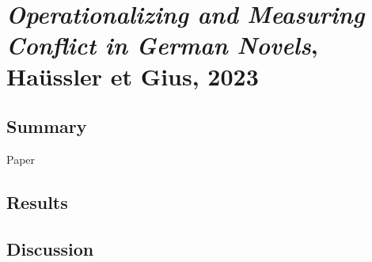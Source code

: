 \documentclass[aspectratio=169]{beamer}
\begin{document}
\section{\textit{Operationalizing and Measuring Conflict in German Novels}, Haüssler et Gius, 2023}

\subsection{Summary}

\begin{frame}{Paper}
\end{frame}

\subsection{Results}

\subsection{Discussion}
\end{document}
